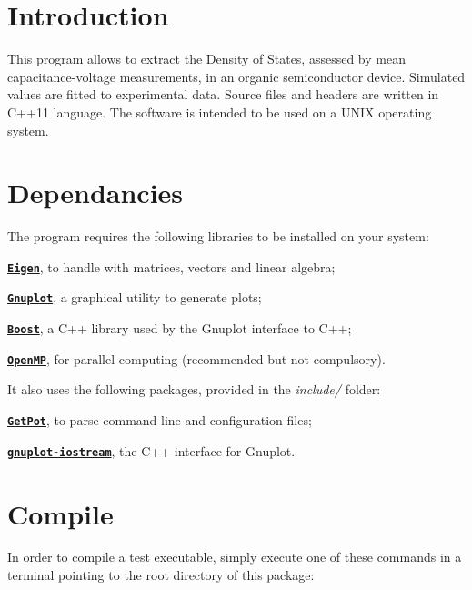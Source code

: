 \hypertarget{index_intro}{}\section{Introduction}\label{index_intro}
This program allows to extract the Density of States, assessed by mean capacitance-\/voltage measurements, in an organic semiconductor device. Simulated values are fitted to experimental data. Source files and headers are written in C++11 language. The software is intended to be used on a U\-N\-I\-X operating system.\hypertarget{index_dependancies}{}\section{Dependancies}\label{index_dependancies}
The program requires the following libraries to be installed on your system\-:

\begin{DoxyItemize}
\item \href{http://eigen.tuxfamily.org}{\tt {\bfseries Eigen}}, to handle with matrices, vectors and linear algebra; \item \href{http://www.gnuplot.info}{\tt {\bfseries Gnuplot}}, a graphical utility to generate plots; \item \href{http://www.boost.org}{\tt {\bfseries Boost}}, a C++ library used by the Gnuplot interface to C++; \item \href{http://openmp.org}{\tt {\bfseries Open\-M\-P}}, for parallel computing (recommended but not compulsory).\end{DoxyItemize}
It also uses the following packages, provided in the {\itshape include/} folder\-: \begin{DoxyItemize}
\item \href{http://getpot.sourceforge.net}{\tt {\bfseries Get\-Pot}}, to parse command-\/line and configuration files; \item \href{http://www.stahlke.org/dan/gnuplot-iostream}{\tt {\bfseries gnuplot-\/iostream}}, the C++ interface for Gnuplot.\end{DoxyItemize}
\hypertarget{index_install_sec}{}\section{Compile}\label{index_install_sec}
In order to compile a test executable, simply execute one of these commands in a terminal pointing to the root directory of this package\-:




